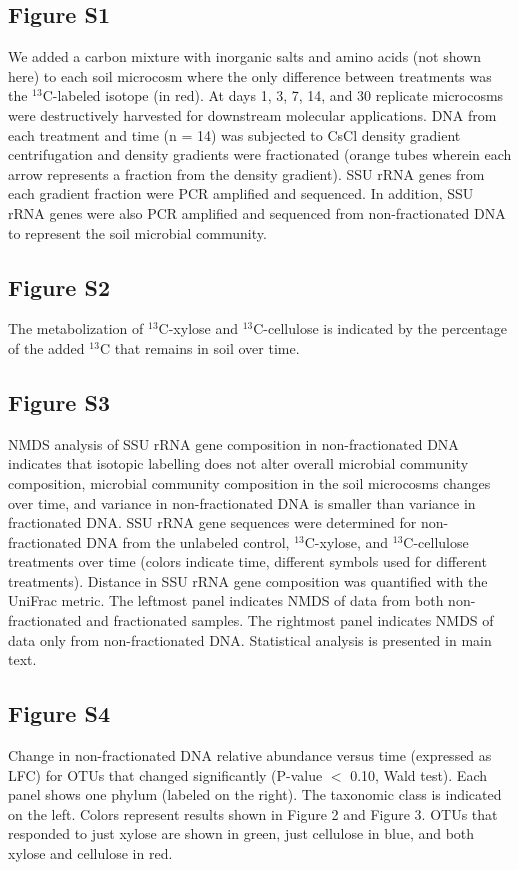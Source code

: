 \subsection{Figure S1}
We added a carbon mixture with inorganic
salts and amino acids (not shown here) to each soil microcosm where the
only difference between treatments was the $^{13}$C-labeled isotope (in red). At days
1, 3, 7, 14, and 30 replicate microcosms were destructively harvested for
downstream molecular applications. DNA from each treatment and time (n = 14)
was subjected to CsCl density gradient centrifugation and density gradients
were fractionated (orange tubes wherein each arrow represents a fraction from
the density gradient). SSU rRNA genes from each gradient fraction were PCR
amplified and sequenced. In addition, SSU rRNA genes were also PCR amplified
and sequenced from non-fractionated DNA to represent the soil microbial
community.

\subsection{Figure S2}
The metabolization of $^{13}$C-xylose and $^{13}$C-cellulose is indicated by
the percentage of the added $^{13}$C that remains in soil over time.
\subsection{Figure S3}
NMDS analysis of SSU rRNA gene composition in non-fractionated DNA indicates
that isotopic labelling does not alter overall microbial community composition,
microbial community composition in the soil microcosms changes over time, and
variance in non-fractionated DNA is smaller than variance in fractionated DNA.
SSU rRNA gene sequences were determined for non-fractionated DNA from the
unlabeled control, $^{13}$C-xylose, and $^{13}$C-cellulose treatments over time (colors
indicate time, different symbols used for different treatments). Distance in SSU
rRNA gene composition was quantified with the UniFrac metric. The
leftmost panel indicates NMDS of data from both non-fractionated and
fractionated samples. The rightmost panel indicates NMDS of data only from
non-fractionated DNA. Statistical analysis is presented in main text.
\subsection{Figure S4}
Change in non-fractionated DNA relative abundance versus time (expressed
as LFC) for OTUs that changed significantly (P-value $<$ 0.10, Wald test).
Each panel shows one phylum (labeled on the right). The taxonomic class is
indicated on the left. Colors represent results shown in Figure 2 and
Figure 3.  OTUs that responded to just xylose are shown in 
green, just cellulose in blue, and both xylose and cellulose in red.  

